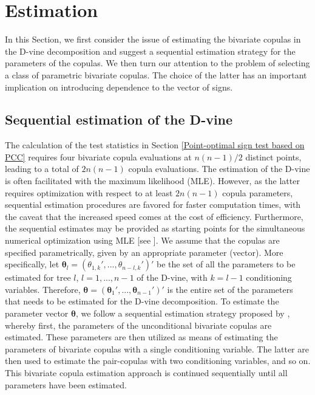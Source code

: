 \documentclass[harvard,11pt]{article}
\begin{document}
\section{Estimation \label{EstimationC3}}
In this Section, we first consider the issue of estimating the bivariate copulas in the D-vine decomposition and suggest a sequential estimation strategy for the parameters of the copulas. We then turn our attention to the problem of selecting a class of parametric bivariate copulas. The choice of the latter has an important implication on introducing dependence to the vector of signs.  
\subsection{Sequential estimation of the D-vine}
\vspace{-3pt}
The calculation of the test statistics in Section \ref{Point-optimal sign test based on PCC} requires four bivariate copula evaluations at $n(n-1)/2$ distinct points, leading to a total of $2n(n-1)$ copula evaluations. The estimation of the D-vine is often facilitated with the maximum likelihood (MLE). However, as the latter requires optimization with respect to at least $2n(n-1)$ copula parameters, sequential estimation procedures are favored for faster computation times, with the caveat that the increased speed comes at the cost of efficiency. Furthermore, the sequential estimates may be provided as starting points for the simultaneous numerical optimization using MLE [see \citet{czado2012maximum, haff2012comparison, dissmann2013selecting}]. We assume that the copulas are specified parametrically, given by an appropriate parameter (vector). More specifically, let $\pmb{\theta}_{l}=(\theta_{1,k}',...,\theta_{n-l,k}')'$ be the set of all the parameters to be estimated for tree $l$, $l=1,...,n-1$ of the D-vine, with $k=l-1$ conditioning variables. Therefore, $\pmb{\theta}=(\pmb{\theta}_1',...,\pmb{\theta}_{n-1}')'$ is the entire set of the parameters that needs to be estimated for the D-vine decomposition. To estimate the parameter vector $\pmb{\theta}$, we follow a sequential estimation strategy proposed by \citet{czado2012maximum}, whereby first, the parameters of the unconditional bivariate copulas are estimated. These parameters are then utilized as means of estimating the parameters of bivariate copulas with a single conditioning variable. The latter are then used to estimate the pair-copulas with two conditioning variables, and so on. This bivariate copula estimation approach is continued sequentially until all parameters have been estimated. 
\end{document}
